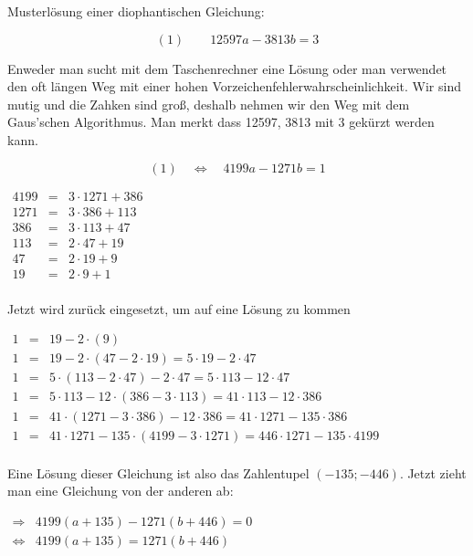 \documentclass[main.tex]{subfiles}
\begin{document}
\begin{Beispiel}
	Musterlösung einer diophantischen Gleichung:
	
	$$(1)\qquad 12597 a - 3813 b = 3$$

	Enweder man sucht mit dem Taschenrechner eine Lösung oder man verwendet den oft längen Weg mit einer hohen Vorzeichenfehlerwahrscheinlichkeit. Wir sind mutig und die Zahken sind groß, deshalb nehmen wir den Weg mit dem Gaus'schen Algorithmus. Man merkt dass 12597, 3813 mit 3 gekürzt werden kann.

	$$(1) \quad \Leftrightarrow \quad 4199 a - 1271 b = 1$$

	$\begin{array}{rcl}
		4199 & = & 3 \cdot 1271 + 386 \\
		1271 & = & 3 \cdot 386 + 113 \\
		386 & = & 3 \cdot 113 + 47 \\
		113 & = & 2 \cdot 47 + 19 \\
		47 & = & 2 \cdot 19 + 9 \\
		19 & = & 2 \cdot 9 + 1 \\
	\end{array}$

	Jetzt wird zurück eingesetzt, um auf eine Lösung zu kommen

	$\begin{array}{rcl}
		1 &=& 19 - 2 \cdot (9) \\
		1 &=& 19 - 2 \cdot (47 - 2\cdot 19) = 5 \cdot 19 - 2 \cdot 47 \\
		1 &=& 5 \cdot (113 - 2\cdot 47) - 2 \cdot 47 = 5 \cdot 113 - 12 \cdot 47 \\
		1 &=& 5 \cdot 113 - 12 \cdot (386 - 3\cdot 113) = 41 \cdot 113 - 12 \cdot 386 \\
		1 &=& 41 \cdot(1271 - 3\cdot 386) - 12\cdot 386 = 41 \cdot 1271 - 135 \cdot 386 \\
		1 &=& 41 \cdot 1271 - 135 \cdot (4199 - 3 \cdot 1271) = 446 \cdot 1271 - 135 \cdot 4199 \\
	\end{array}$

	Eine Lösung dieser Gleichung ist also das Zahlentupel $(-135;-446)$. Jetzt zieht man eine Gleichung von der anderen ab:

	$\begin{array}{rl}
		\Rightarrow & 4199 (a + 135) - 1271 (b + 446) = 0 \\
		\Leftrightarrow & 4199 (a + 135) = 1271 (b + 446) \\
	\end{array}$


\end{Beispiel}
\end{document}
